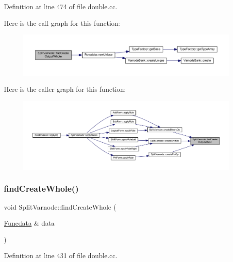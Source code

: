 Definition at line 474 of file double.\+cc.

Here is the call graph for this function\+:
\nopagebreak
\begin{figure}[H]
\begin{center}
\leavevmode
\includegraphics[width=350pt]{class_split_varnode_a6b3c7a86293983e897c0da90f46d1499_cgraph}
\end{center}
\end{figure}
Here is the caller graph for this function\+:
\nopagebreak
\begin{figure}[H]
\begin{center}
\leavevmode
\includegraphics[width=350pt]{class_split_varnode_a6b3c7a86293983e897c0da90f46d1499_icgraph}
\end{center}
\end{figure}
\mbox{\label{class_split_varnode_a957febfb33e3d53592bb677c388384e9}} 
\subsubsection{\texorpdfstring{findCreateWhole()}{findCreateWhole()}}
{\footnotesize\ttfamily void Split\+Varnode\+::find\+Create\+Whole (\begin{DoxyParamCaption}\item[{\mbox{\hyperlink{class_funcdata}{Funcdata}} \&}]{data }\end{DoxyParamCaption})}



Definition at line 431 of file double.\+cc.

